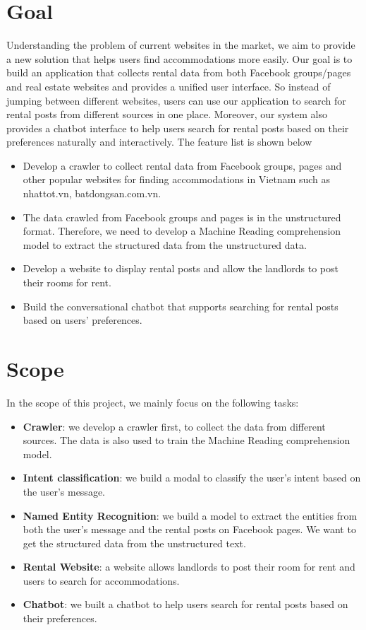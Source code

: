 \section{Goal}
Understanding the problem of current websites in the market, we aim to provide a new solution that helps users find accommodations more easily. Our goal is to build an application that collects rental data from both Facebook groups/pages and real estate websites and provides a unified user interface. So instead of jumping between different websites, users can use our application to search for rental posts from different sources in one place. Moreover, our system also provides a chatbot interface to help users search for rental posts based on their preferences naturally and interactively. The feature list is shown below
\begin{itemize}
    \item Develop a crawler to collect rental data from Facebook groups, pages and other popular websites for finding accommodations in Vietnam such as nhattot.vn, batdongsan.com.vn.
    \item The data crawled from Facebook groups and pages is in the unstructured format. Therefore, we need to develop a Machine Reading comprehension model to extract the structured data from the unstructured data.
    \item Develop a website to display rental posts and allow the landlords to post their rooms for rent.
    \item Build the conversational chatbot that supports searching for rental posts based on users' preferences.
\end{itemize}

\section{Scope}
In the scope of this project, we mainly focus on the following tasks:

\begin{itemize}
    \item \textbf{Crawler}: we develop a crawler first, to collect the data from different sources. The data is also used to train the Machine Reading comprehension model.
    \item \textbf{Intent classification}: we build a modal to classify the user's intent based on the user's message.
    \item \textbf{Named Entity Recognition}: we build a model to extract the entities from both the user's message and the rental posts on Facebook pages. We want to get the structured data from the unstructured text.
    \item \textbf{Rental Website}: a website allows landlords to post their room for rent and users to search for accommodations.
    \item \textbf{Chatbot}: we built a chatbot to help users search for rental posts based on their preferences.
\end{itemize}
